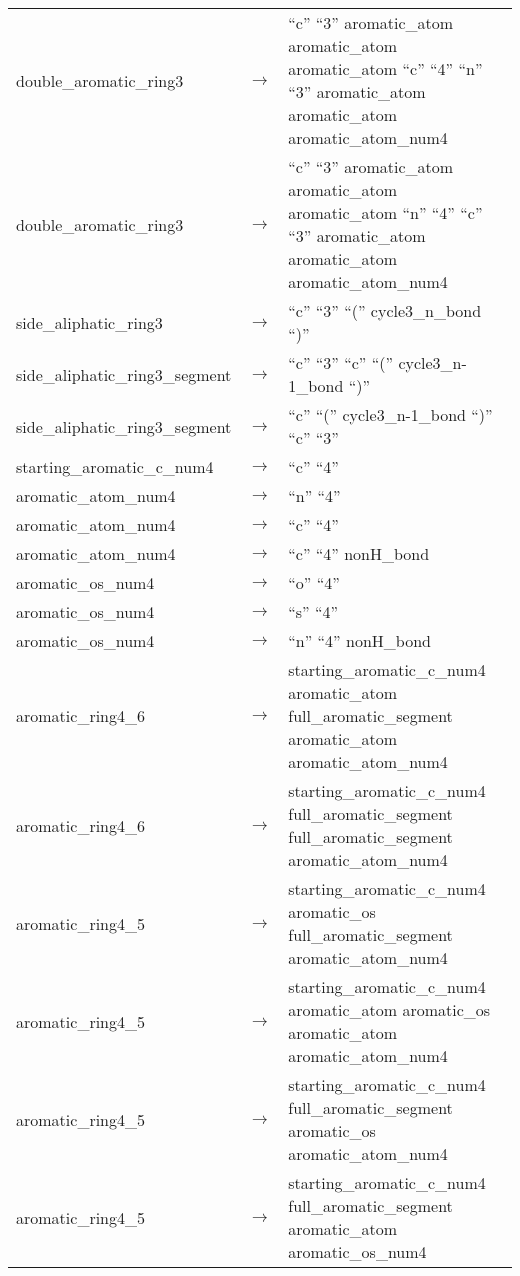 \documentclass[../Document.tex]{subfiles}
\begin{document}
\begin{longtable}{m{} p{} p{}}
    double\_aromatic\_ring3 & $\rightarrow$ & ``c'' ``3'' aromatic\_atom aromatic\_atom aromatic\_atom ``c'' ``4'' ``n'' ``3'' aromatic\_atom aromatic\_atom aromatic\_atom\_num4 \\
    double\_aromatic\_ring3 & $\rightarrow$ & ``c'' ``3'' aromatic\_atom aromatic\_atom aromatic\_atom ``n'' ``4'' ``c'' ``3'' aromatic\_atom aromatic\_atom aromatic\_atom\_num4 \\
    side\_aliphatic\_ring3 & $\rightarrow$ & ``c'' ``3'' ``('' cycle3\_n\_bond ``)'' \\
    side\_aliphatic\_ring3\_segment & $\rightarrow$ & ``c'' ``3'' ``c'' ``('' cycle3\_n-1\_bond ``)'' \\
    side\_aliphatic\_ring3\_segment & $\rightarrow$ & ``c'' ``('' cycle3\_n-1\_bond ``)'' ``c'' ``3'' \\
    starting\_aromatic\_c\_num4 & $\rightarrow$ & ``c'' ``4'' \\
    aromatic\_atom\_num4 & $\rightarrow$ & ``n'' ``4'' \\
    aromatic\_atom\_num4 & $\rightarrow$ & ``c'' ``4'' \\
    aromatic\_atom\_num4 & $\rightarrow$ & ``c'' ``4'' nonH\_bond \\
    aromatic\_os\_num4 & $\rightarrow$ & ``o'' ``4'' \\
    aromatic\_os\_num4 & $\rightarrow$ & ``s'' ``4'' \\
    aromatic\_os\_num4 & $\rightarrow$ & ``n'' ``4'' nonH\_bond \\
    aromatic\_ring4\_6 & $\rightarrow$ & starting\_aromatic\_c\_num4 aromatic\_atom full\_aromatic\_segment aromatic\_atom aromatic\_atom\_num4 \\
    aromatic\_ring4\_6 & $\rightarrow$ & starting\_aromatic\_c\_num4 full\_aromatic\_segment full\_aromatic\_segment aromatic\_atom\_num4 \\
    aromatic\_ring4\_5 & $\rightarrow$ & starting\_aromatic\_c\_num4 aromatic\_os full\_aromatic\_segment aromatic\_atom\_num4 \\
    aromatic\_ring4\_5 & $\rightarrow$ & starting\_aromatic\_c\_num4 aromatic\_atom aromatic\_os aromatic\_atom aromatic\_atom\_num4 \\
    aromatic\_ring4\_5 & $\rightarrow$ & starting\_aromatic\_c\_num4 full\_aromatic\_segment aromatic\_os aromatic\_atom\_num4 \\
    aromatic\_ring4\_5 & $\rightarrow$ & starting\_aromatic\_c\_num4 full\_aromatic\_segment aromatic\_atom aromatic\_os\_num4 \\

\end{longtable}
\end{document}
